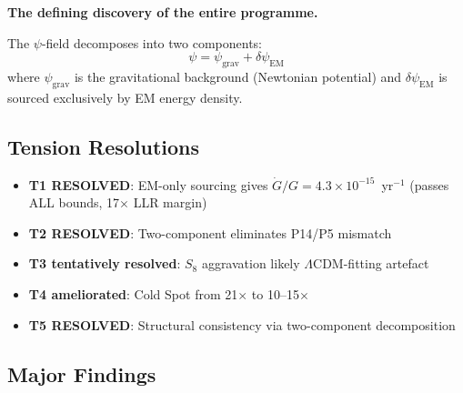 \documentclass[11pt,a4paper]{article}
\begin{document}
\noindent\textbf{The defining discovery of the entire programme.}

The $\psi$-field decomposes into two components:
\[
\psi = \psi_\mathrm{grav} + \delta\psi_\mathrm{EM}
\]
where $\psi_\mathrm{grav}$ is the gravitational background (Newtonian potential) and
$\delta\psi_\mathrm{EM}$ is sourced exclusively by EM energy density.

\subsection{Tension Resolutions}
\begin{itemize}[nosep]
\item \textbf{T1 RESOLVED}: EM-only sourcing gives $\dot{G}/G = 4.3\times10^{-15}$~yr$^{-1}$ (passes ALL bounds, 17$\times$ LLR margin)
\item \textbf{T2 RESOLVED}: Two-component eliminates P14/P5 mismatch
\item \textbf{T3 tentatively resolved}: $S_8$ aggravation likely $\Lambda$CDM-fitting artefact
\item \textbf{T4 ameliorated}: Cold Spot from 21$\times$ to 10--15$\times$
\item \textbf{T5 RESOLVED}: Structural consistency via two-component decomposition
\end{itemize}

\subsection{Major Findings}
\end{document}

